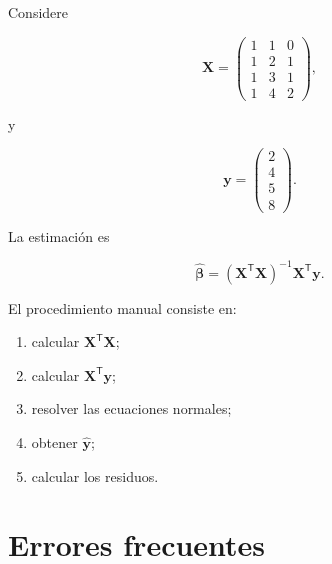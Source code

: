 \documentclass[
  spanish,
  10.5pt,
  letterpaper,
  DIV=11,
  numbers=noendperiod,
  oneside,
  open=any]{scrreprt}
\providecommand{\tightlist}{%
  \setlength{\itemsep}{0pt}\setlength{\parskip}{0pt}}
\theoremstyle{definition}
\theoremstyle{definition}
\theoremstyle{plain}
\theoremstyle{remark}
\begin{document}

Considere

\[
\mathbf{X}
=
\begin{pmatrix}
1 & 1 & 0\\
1 & 2 & 1\\
1 & 3 & 1\\
1 & 4 & 2
\end{pmatrix},
\]

y

\[
\mathbf{y}
=
\begin{pmatrix}
2\\
4\\
5\\
8
\end{pmatrix}.
\]

La estimación es

\[
\widehat{\boldsymbol{\beta}}
=
\left(
\mathbf{X}^{\mathsf T}\mathbf{X}
\right)^{-1}
\mathbf{X}^{\mathsf T}\mathbf{y}.
\]

El procedimiento manual consiste en:

\begin{enumerate}
\def\labelenumi{\arabic{enumi}.}
\tightlist
\item
  calcular \(\mathbf{X}^{\mathsf T}\mathbf{X}\);
\item
  calcular \(\mathbf{X}^{\mathsf T}\mathbf{y}\);
\item
  resolver las ecuaciones normales;
\item
  obtener \(\widehat{\mathbf{y}}\);
\item
  calcular los residuos.
\end{enumerate}

\section*{Errores frecuentes}\label{errores-frecuentes-8}

\end{document}
